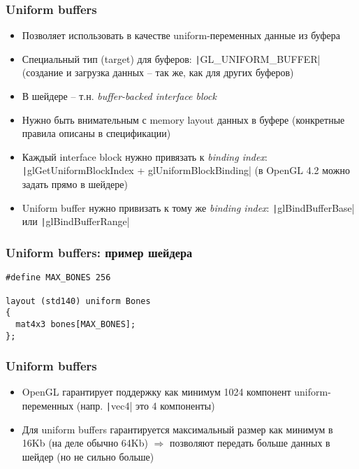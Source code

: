 \documentclass{beamer}
\begin{document}
\begin{frame}[fragile]
\frametitle{Uniform buffers}
\begin{itemize}
\item Позволяет использовать в качестве uniform-переменных данные из буфера
\pause
\item Специальный тип (target) для буферов: \texttt|GL_UNIFORM_BUFFER| (создание и загрузка данных -- так же, как для других буферов)
\pause
\item В шейдере -- т.н. \textit{buffer-backed interface block}
\pause
\item Нужно быть внимательным с memory layout данных в буфере (конкретные правила описаны в спецификации)
\pause
\item Каждый interface block нужно привязать к \textit{binding index}: \texttt|glGetUniformBlockIndex + glUniformBlockBinding| (в OpenGL 4.2 можно задать прямо в шейдере)
\item Uniform buffer нужно привизать к тому же \textit{binding index}: \texttt|glBindBufferBase| или \texttt|glBindBufferRange|
\end{itemize}
\end{frame}

\begin{frame}[fragile]
\frametitle{Uniform buffers: пример шейдера}
\begin{verbatim}
#define MAX_BONES 256

layout (std140) uniform Bones
{
  mat4x3 bones[MAX_BONES];
};
\end{verbatim}
\end{frame}

\begin{frame}[fragile]
\frametitle{Uniform buffers}
\begin{itemize}
\item OpenGL гарантирует поддержку как минимум 1024 компонент uniform-переменных (напр. \texttt|vec4| это 4 компоненты)
\pause
\item Для uniform buffers гарантируется максимальный размер как минимум в 16Kb (на деле обычно 64Kb) \begin{math}\Longrightarrow\end{math} позволяют передать больше данных в шейдер (но не сильно больше)
\end{itemize}
\end{frame}
\end{document}
